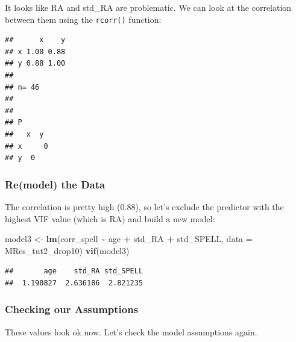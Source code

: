 \documentclass[
]{book}
\newenvironment{Shaded}{\begin{snugshade}}{\end{snugshade}}
\newcommand{\AttributeTok}[1]{\textcolor[rgb]{0.13,0.29,0.53}{#1}}
\newcommand{\FunctionTok}[1]{\textcolor[rgb]{0.13,0.29,0.53}{\textbf{#1}}}
\newcommand{\NormalTok}[1]{#1}
\newcommand{\OtherTok}[1]{\textcolor[rgb]{0.56,0.35,0.01}{#1}}
\newcommand{\SpecialCharTok}[1]{\textcolor[rgb]{0.81,0.36,0.00}{\textbf{#1}}}
\begin{document}
It looks like RA and std\_RA are problematic. We can look at the correlation between them using the \texttt{rcorr()} function:

\begin{Shaded}
\end{Shaded}

\begin{verbatim}
##      x    y
## x 1.00 0.88
## y 0.88 1.00
## 
## n= 46 
## 
## 
## P
##   x  y 
## x     0
## y  0
\end{verbatim}

\hypertarget{remodel-the-data-1}{%
\subsubsection*{Re(model) the Data}\label{remodel-the-data-1}}

The correlation is pretty high (0.88), so let's exclude the predictor with the highest VIF value (which is RA) and build a new model:

\begin{Shaded}
\begin{Highlighting}[]
\NormalTok{model3 }\OtherTok{\textless{}{-}} \FunctionTok{lm}\NormalTok{(corr\_spell }\SpecialCharTok{\textasciitilde{}}\NormalTok{ age }\SpecialCharTok{+}\NormalTok{ std\_RA }\SpecialCharTok{+}\NormalTok{ std\_SPELL, }\AttributeTok{data =}\NormalTok{ MRes\_tut2\_drop10)}
\FunctionTok{vif}\NormalTok{(model3)}
\end{Highlighting}
\end{Shaded}

\begin{verbatim}
##       age    std_RA std_SPELL 
##  1.190827  2.636186  2.821235
\end{verbatim}

\hypertarget{checking-our-assumptions-3}{%
\subsubsection*{Checking our Assumptions}\label{checking-our-assumptions-3}}

These values look ok now. Let's check the model assumptions again.
\end{document}
